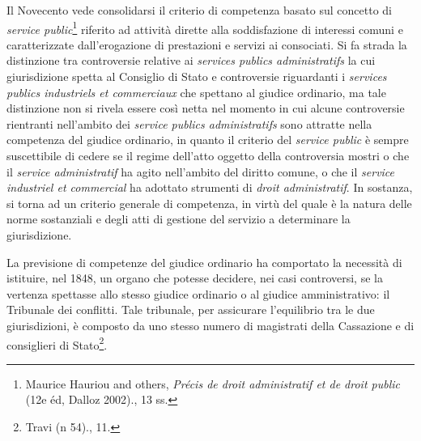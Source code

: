 \documentclass[12pt,it,a4paper,]{report}
\begin{document}
Il Novecento vede consolidarsi il criterio di competenza basato sul
concetto di \emph{service public}\footnote{{Maurice Hauriou and others,
  \emph{Précis de droit administratif et de droit public} (12e éd,
  Dalloz 2002).}, 13 ss.} riferito ad attività dirette alla
soddisfazione di interessi comuni e caratterizzate dall'erogazione di
prestazioni e servizi ai consociati. Si fa strada la distinzione tra
controversie relative ai \emph{services publics administratifs} la cui
giurisdizione spetta al Consiglio di Stato e controversie riguardanti i
\emph{services publics industriels et commerciaux} che spettano al
giudice ordinario, ma tale distinzione non si rivela essere così netta
nel momento in cui alcune controversie rientranti nell'ambito dei
\emph{service publics administratifs} sono attratte nella competenza del
giudice ordinario, in quanto il criterio del \emph{service public} è
sempre suscettibile di cedere se il regime dell'atto oggetto della
controversia mostri o che il \emph{service administratif} ha agito
nell'ambito del diritto comune, o che il \emph{service industriel et
commercial} ha adottato strumenti di \emph{droit administratif}. In
sostanza, si torna ad un criterio generale di competenza, in virtù del
quale è la natura delle norme sostanziali e degli atti di gestione del
servizio a determinare la giurisdizione.

La previsione di competenze del giudice ordinario ha comportato la
necessità di istituire, nel 1848, un organo che potesse decidere, nei
casi controversi, se la vertenza spettasse allo stesso giudice ordinario
o al giudice amministrativo: il Tribunale dei conflitti. Tale tribunale,
per assicurare l'equilibrio tra le due giurisdizioni, è composto da uno
stesso numero di magistrati della Cassazione e di consiglieri di
Stato\footnote{{Travi (n 54).}, 11.}.
\end{document}
